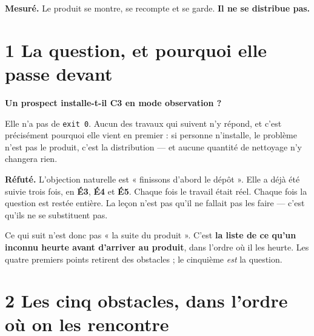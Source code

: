 \documentclass[11pt]{article}
\newcommand{\code}[1]{\texttt{\small #1}}
\newcommand{\mm}[1]{\textbf{#1}}
\newcommand{\mesure}[1]{{\color{efeteal}\textbf{Mesuré.} }#1\par}
\newcommand{\refute}[1]{{\color{efered}\textbf{Réfuté.} }#1\par}
\begin{document}
\mesure{Le produit se montre, se recompte et se garde. \textbf{Il ne se distribue pas.}}

\section{1 \;\textbar\; La question, et pourquoi elle passe devant}

\begin{cadre}
\textbf{Un prospect installe-t-il C3 en mode observation ?}

Elle n'a pas de \code{exit 0}. Aucun des travaux qui suivent n'y répond, et c'est précisément
pourquoi elle vient en premier : si personne n'installe, le problème n'est pas le produit, c'est
la distribution --- et aucune quantité de nettoyage n'y changera rien.

\refute{L'objection naturelle est « finissons d'abord le dépôt ». Elle a déjà été suivie trois
fois, en \mm{É3}, \mm{É4} et \mm{É5}. Chaque fois le travail était réel. Chaque fois la question
est restée entière. La leçon n'est pas qu'il ne fallait pas les faire --- c'est qu'ils ne se
substituent pas.}
\end{cadre}

Ce qui suit n'est donc pas « la suite du produit ». C'est \textbf{la liste de ce qu'un inconnu
heurte avant d'arriver au produit}, dans l'ordre où il les heurte. Les quatre premiers points
retirent des obstacles ; le cinquième \emph{est} la question.

\section{2 \;\textbar\; Les cinq obstacles, dans l'ordre où on les rencontre}
\end{document}
